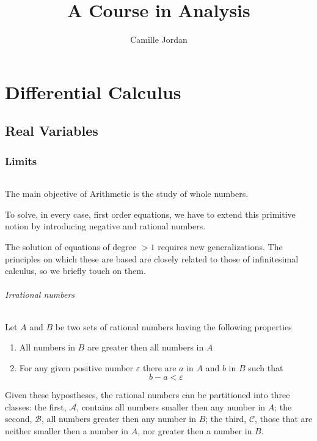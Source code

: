 \documentclass[10pt,letterpaper]{book}
\title{A Course in Analysis}
\author{Camille Jordan}
\renewcommand\epsilon{\varepsilon}
\theoremstyle{definition}
\begin{document}
\maketitle
\tableofcontents


\part{Differential Calculus}

\chapter{Real Variables}

\section{Limits}

\paragraph{} 
The main objective of Arithmetic is the study of whole numbers.

To solve, in every case, first order equations, we have to extend this primitive notion by introducing negative and rational numbers.

The solution of equations of degree $> 1$ requires new generalizations. The principles on which these are based are closely related to those of infinitesimal calculus, so we briefly touch on them.


\paragraph{Irrational numbers} Let $A$ and $B$ be two sets of rational numbers having the following properties
\begin{enumerate}
\item All numbers in $B$ are greater then all numbers in $A$
\item For any given positive number $\epsilon$ there are $a$ in $A$ and $b$ in $B$ such that
\[
  b - a < \epsilon
\]
\end{enumerate}
Given these hypostheses, the rational numbers can be partitioned into three classes: the first, $\mathcal{A}$, contains all numbers smaller then any number in $A$; the second, $\mathcal B$, all numbers greater then any number in $B$; the third, $\mathcal C$, those that are neither smaller then a number in $A$, nor greater then a number in $B$.
\end{document}
